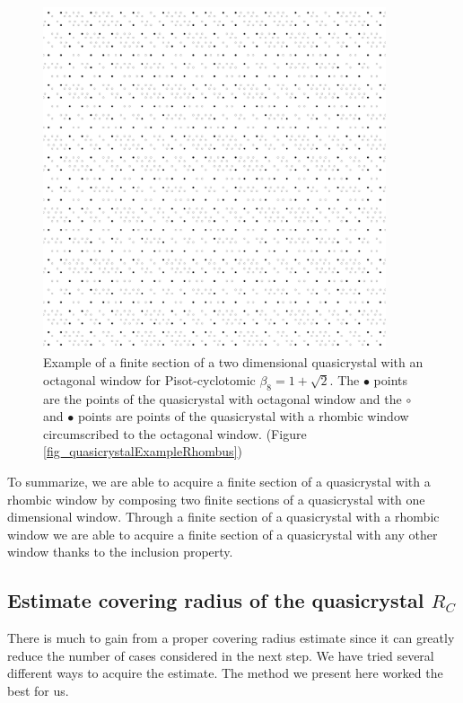 \documentclass[text.tex]{subfiles}
\begin{document}
\begin{figure}[h!]
\centering
\includegraphics[width=0.9\textwidth]{img/2D/octagon}
\caption{Example of a finite section of a two dimensional quasicrystal with an octagonal window for Pisot-cyclotomic $\beta_8=1+\sqrt{2}$. The $\bullet$ points are the points of the quasicrystal with octagonal window and the $\circ$ and $\bullet$ points are points of the quasicrystal with a rhombic window circumscribed to the octagonal window. (Figure \ref{fig_quasicrystalExampleRhombus})}
\label{fig_quasicrystalExampleOctagon}
\end{figure}

To summarize, we are able to acquire a finite section of a quasicrystal with a rhombic window by composing two finite sections of a quasicrystal with one dimensional window. Through a finite section of a quasicrystal with a rhombic window we are able to acquire a finite section of a quasicrystal with any other window thanks to the inclusion property. 

\subsection{Estimate covering radius of the quasicrystal $R_C$}
There is much to gain from a proper covering radius estimate since it can greatly reduce the number of cases considered in the next step. We have tried several different ways to acquire the estimate. The method we present here worked the best for us. 
\end{document}
